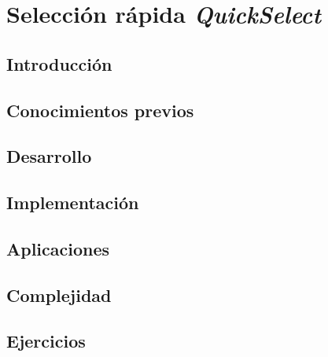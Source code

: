 \chapter{Selección rápida \emph{QuickSelect}}
\section{Introducción}

\section{Conocimientos previos}

\section{Desarrollo}

\section{Implementación}

\section{Aplicaciones}

\section{Complejidad}

\section{Ejercicios}
